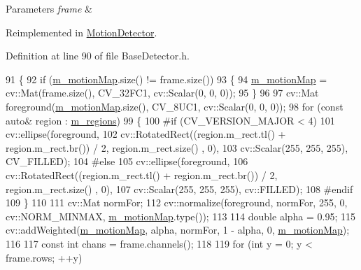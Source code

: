 \begin{DoxyParams}{Parameters}
{\em frame} & \\
\hline
\end{DoxyParams}


Reimplemented in \mbox{\hyperlink{class_motion_detector_aa4e606acafdc33a3104471903e449adc}{Motion\+Detector}}.



Definition at line 90 of file Base\+Detector.\+h.


\begin{DoxyCode}
91     \{
92         \textcolor{keywordflow}{if} (\mbox{\hyperlink{class_base_detector_a45a2d54a0b69e271aa5c44ee301682b7}{m\_motionMap}}.size() != frame.size())
93         \{
94             \mbox{\hyperlink{class_base_detector_a45a2d54a0b69e271aa5c44ee301682b7}{m\_motionMap}} = cv::Mat(frame.size(), CV\_32FC1, cv::Scalar(0, 0, 0));
95         \}
96 
97         cv::Mat foreground(\mbox{\hyperlink{class_base_detector_a45a2d54a0b69e271aa5c44ee301682b7}{m\_motionMap}}.size(), CV\_8UC1, cv::Scalar(0, 0, 0));
98         \textcolor{keywordflow}{for} (\textcolor{keyword}{const} \textcolor{keyword}{auto}& region : \mbox{\hyperlink{class_base_detector_a409c20093acba261db8354ca72058fce}{m\_regions}})
99         \{
100 \textcolor{preprocessor}{#if (CV\_VERSION\_MAJOR < 4)}
101             cv::ellipse(foreground,
102                         cv::RotatedRect((region.m\_rect.tl() + region.m\_rect.br()) / 2, region.m\_rect.size()
      , 0),
103                                         cv::Scalar(255, 255, 255), CV\_FILLED);
104 \textcolor{preprocessor}{#else}
105             cv::ellipse(foreground,
106                         cv::RotatedRect((region.m\_rect.tl() + region.m\_rect.br()) / 2, region.m\_rect.size()
      , 0),
107                                         cv::Scalar(255, 255, 255), cv::FILLED);
108 \textcolor{preprocessor}{#endif}
109         \}
110 
111         cv::Mat normFor;
112         cv::normalize(foreground, normFor, 255, 0, cv::NORM\_MINMAX, \mbox{\hyperlink{class_base_detector_a45a2d54a0b69e271aa5c44ee301682b7}{m\_motionMap}}.type());
113 
114         \textcolor{keywordtype}{double} alpha = 0.95;
115         cv::addWeighted(\mbox{\hyperlink{class_base_detector_a45a2d54a0b69e271aa5c44ee301682b7}{m\_motionMap}}, alpha, normFor, 1 - alpha, 0, 
      \mbox{\hyperlink{class_base_detector_a45a2d54a0b69e271aa5c44ee301682b7}{m\_motionMap}});
116 
117         \textcolor{keyword}{const} \textcolor{keywordtype}{int} chans = frame.channels();
118 
119         \textcolor{keywordflow}{for} (\textcolor{keywordtype}{int} y = 0; y < frame.rows; ++y)

\end{DoxyCode}
